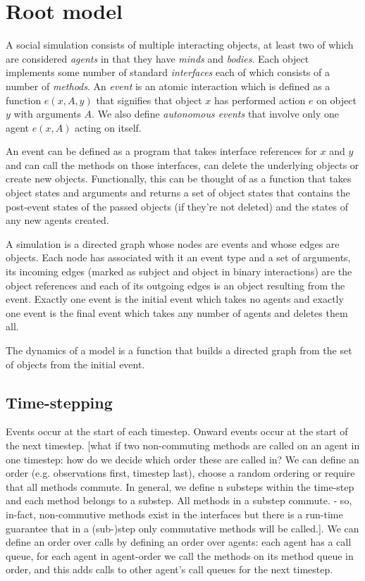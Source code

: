 \documentclass[a4paper]{article}
\begin{document}
\section{Root model}

A social simulation consists of multiple interacting objects, at least two of which are considered \textit{agents} in that they have \textit{minds} and \textit{bodies}. Each object implements some number of standard \textit{interfaces} each of which consists of a number of \textit{methods}. An \textit{event} is an atomic interaction which is defined as a function $e(x,A,y)$ that signifies that object $x$ has performed action $e$ on object $y$ with arguments $A$. We also define \textit{autonomous events} that involve only one agent $e(x,A)$ acting on itself.

An event can be defined as a program that takes interface references for $x$ and $y$ and can call the methods on those interfaces, can delete the underlying objects or create new objects. Functionally, this can be thought of as a function that takes object states and arguments and returns a set of object states that contains the post-event states of the passed objects (if they're not deleted) and the states of any new agents created.

A simulation is a directed graph whose nodes are events and whose edges are objects. Each node has associated with it an event type and a set of arguments, its incoming edges (marked as subject and object in binary interactions) are the object references and each of its outgoing edges is an object resulting from the event. Exactly one event is the initial event which takes no agents and exactly one event is the final event which takes any number of agents and deletes them all.

The dynamics of a model is a function that builds a directed graph from the set of objects from the initial event.


\subsection{Time-stepping}

Events occur at the start of each timestep. Onward events occur at the start of the next timestep. [what if two non-commuting methods are called on an agent in one timestep: how do we decide which order these are called in? We can define an order (e.g. observations first, timestep last), choose a random ordering or require that all methods commute. In general, we define n substeps within the time-step and each method belongs to a substep. All methods in a substep commute. - so, in-fact, non-commutive methods exist in the interfaces but there is a run-time guarantee that in a (sub-)step only commutative methods will be called.]. We can define an order over calls by defining an order over agents: each agent has a call queue, for each agent in agent-order we call the methods on its method queue in order, and this adds calls to other agent's call queues for the next timestep.
\end{document}

